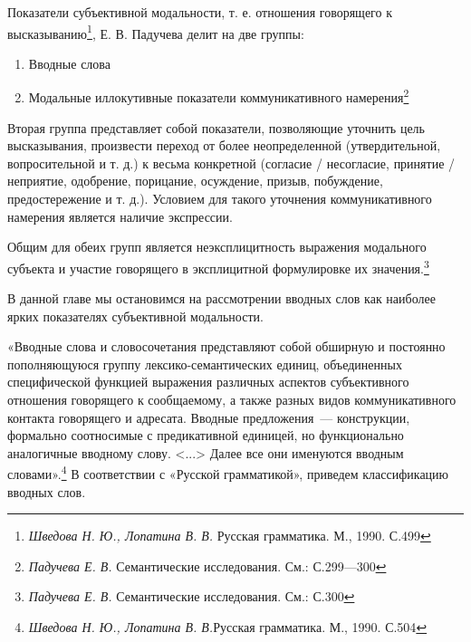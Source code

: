 \documentclass{kursa4}
\begin{document}
{      Показатели субъективной модальности, т. е. отношения говорящего к
      высказыванию\footnote{\textit{ Шведова Н. Ю., Лопатина
      В. В.} Русская грамматика. М., 1990. С.499}, Е. В. Падучева делит на две группы: 

      \begin{enumerate}
        \item Вводные слова
        \item Модальные иллокутивные показатели коммуникативного
        намерения\footnote{\textit{Падучева Е. В.} Семантические исследования. См.: С.299—300}        
      \end{enumerate}

      Вторая группа представляет собой показатели, позволяющие уточнить цель
      высказывания, произвести переход от более неопределенной
      (утвердительной, вопросительной и т. д.) к весьма конкретной (согласие
      / несогласие, принятие / неприятие, одобрение, порицание, осуждение,
      призыв, побуждение, предостережение и т. д.). Условием для такого
      уточнения коммуникативного намерения является наличие экспрессии. 

      Общим для обеих групп является неэксплицитность выражения модального
      субъекта и участие говорящего в эксплицитной формулировке их
      значения.\footnote{\textit{Падучева Е. В.
      }Семантические исследования. См.: С.300}

      В данной главе мы остановимся на рассмотрении вводных слов как
      наиболее ярких показателях субъективной модальности.

      «Вводные слова и словосочетания представляют собой обширную и
      постоянно пополняющуюся группу лексико-семантических единиц,
      объединенных специфической функцией выражения различных аспектов
      субъективного отношения говорящего к сообщаемому, а также разных видов
      коммуникативного контакта говорящего и адресата. Вводные предложения~---
      конструкции, формально соотносимые с предикативной единицей, но
      функционально аналогичные вводному слову. \textless{}...\textgreater{}
      Далее все они именуются вводным
      словами».\footnote{\textit{Шведова Н. Ю., Лопатина В. В.}{Русская грамматика. М., 1990. С.504}}\newline
      В соответствии с «Русской грамматикой», приведем классификацию вводных слов.

}
\end{document}

